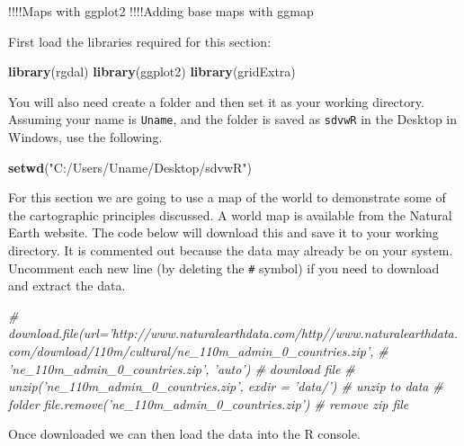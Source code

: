 \documentclass[]{article}
\newenvironment{Shaded}{}{}
\newcommand{\KeywordTok}[1]{\textcolor[rgb]{0.00,0.44,0.13}{\textbf{{#1}}}}
\newcommand{\StringTok}[1]{\textcolor[rgb]{0.25,0.44,0.63}{{#1}}}
\newcommand{\CommentTok}[1]{\textcolor[rgb]{0.38,0.63,0.69}{\textit{{#1}}}}
\newcommand{\NormalTok}[1]{{#1}}
\begin{document}
!!!!Maps with ggplot2 !!!!Adding base maps with ggmap

First load the libraries required for this section:

\begin{Shaded}
\begin{Highlighting}[]
\KeywordTok{library}\NormalTok{(rgdal)}
\KeywordTok{library}\NormalTok{(ggplot2)}
\KeywordTok{library}\NormalTok{(gridExtra)}
\end{Highlighting}
\end{Shaded}
You will also need create a folder and then set it as your working
directory. Assuming your name is \texttt{Uname}, and the folder is saved
as \texttt{sdvwR} in the Desktop in Windows, use the following.

\begin{Shaded}
\begin{Highlighting}[]
\KeywordTok{setwd}\NormalTok{(}\StringTok{"C:/Users/Uname/Desktop/sdvwR"}\NormalTok{)}
\end{Highlighting}
\end{Shaded}
For this section we are going to use a map of the world to demonstrate
some of the cartographic principles discussed. A world map is available
from the Natural Earth website. The code below will download this and
save it to your working directory. It is commented out because the data
may already be on your system. Uncomment each new line (by deleting the
\texttt{\#} symbol) if you need to download and extract the data.

\begin{Shaded}
\begin{Highlighting}[]
\CommentTok{# download.file(url='http://www.naturalearthdata.com/http//www.naturalearthdata.com/download/110m/cultural/ne_110m_admin_0_countries.zip',}
\CommentTok{# 'ne_110m_admin_0_countries.zip', 'auto') # download file}
\CommentTok{# unzip('ne_110m_admin_0_countries.zip', exdir = 'data/') # unzip to data}
\CommentTok{# folder file.remove('ne_110m_admin_0_countries.zip') # remove zip file}
\end{Highlighting}
\end{Shaded}
Once downloaded we can then load the data into the R console.
\end{document}

